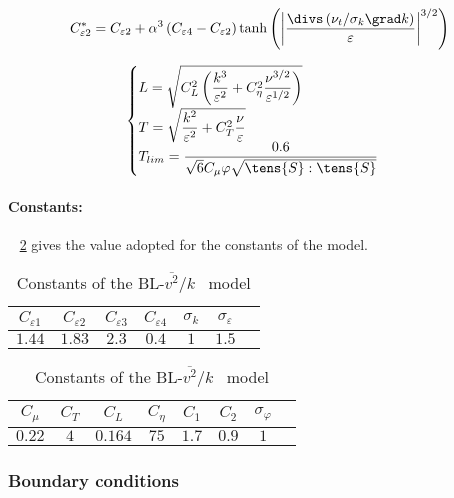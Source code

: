 \begin{equation}
         	C_{\varepsilon 2}^*=C_{\varepsilon 2}+ \alpha^3 \left( C_{\varepsilon 4}-C_{\varepsilon 2} \right) \tanh \left( \left| \frac{\divs \left(\nu_t/\sigma_k \grad k\right)}{\varepsilon} \right|^{3/2}   \right)
	\label{eq:turbul:blv2kcep2}
\end{equation}

\begin{equation}
	\label{eq:turbul:blv2kscales}
		\begin{cases}
			L = \sqrt{C_{L}^{2}\left(\dfrac{k^{3}}{\varepsilon^{2}}+C_{\eta}^{2}\dfrac{\nu^{3/2}}{\varepsilon^{1/2}}\right)} & \\
			T = \sqrt{\dfrac{k^{2}}{\varepsilon^{2}}+C_{T}^{2}\dfrac{\nu}{\varepsilon}} & \\
			T_{lim} = \dfrac{0.6}{\sqrt{6}C_\mu \varphi \sqrt{\tens{S} : \tens{S}}}
		\end{cases}
\end{equation}

\paragraph{Constants:}
\tablename~ \ref{tab:turbul:cstblv2k} gives the value adopted for the constants of the model.

\begin{table}[!htp]
\centering
\begin{tabular}{ccccccc}
	\hline 
	$C_{\varepsilon 1}$ & $C_{\varepsilon 2}$ & $C_{\varepsilon 3} $ & $C_{\varepsilon 4}$ & $\sigma_k$ & $\sigma_{\varepsilon}$\\
	\hline
	$ 1.44 $ & $1.83$ & $2.3$ & $0.4$ & $1$ & $1.5$ \\
	\hline
\end{tabular}

\begin{tabular}{cccccccc}
	\hline 
	 $C_\mu$ & $C_T$ & $C_{L}$ & $C_{\eta}$ & $C_1$ & $C_2$ & $\sigma_\varphi$\\
	\hline
	 $0.22$ & $4$ & $0.164$ & $75$ & $1.7$ & $0.9$  &  $1$ \\
	\hline
\end{tabular}
\caption{\label{tab:turbul:cstblv2k} Constants of the BL-$\overline{v^2}/k$~ model}
\end{table}

\subsubsection{Boundary conditions}

